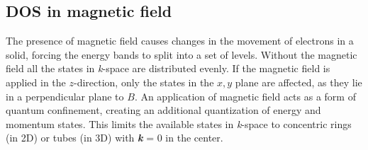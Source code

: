 \documentclass[titlepage,a4paper]{book}
\newcommand{\wciecie}{\quad\phantom{v}}
\begin{document}


\subsection{DOS in magnetic field}
\label{section:DOS_at_magneticField}
\wciecie
The presence of magnetic field causes changes in the movement of electrons in a solid, forcing the energy bands to split into a set of levels. Without the magnetic field all the states in \textit{k}-space are distributed evenly. If the magnetic field is applied in the $z$-direction, only the states in the $x,y$ plane are affected, as they lie in a perpendicular plane to $B$. An application of magnetic field acts as a form of quantum confinement, creating an additional quantization of energy and momentum states. This limits the available states in \textit{k}-space to concentric rings (in 2D) or tubes (in 3D) with \textbf{\textit{k}} = 0 in the center. 
\end{document}
